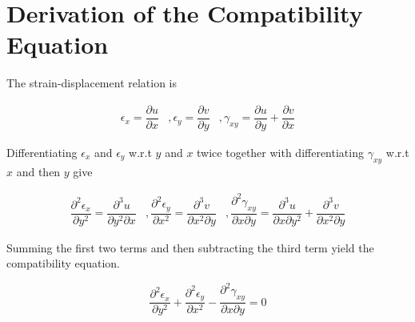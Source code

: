 \section{Derivation of the Compatibility Equation} \label{app:compatibility_eqn}

The strain-displacement relation is

\begin{equation*}
    \begin{matrix}
    \epsilon_x = \dfrac{\partial u}{\partial x} & , 
    \epsilon_y = \dfrac{\partial v}{\partial y} & , 
    \gamma_{xy} = \dfrac{\partial u}{\partial y} + \dfrac{\partial v}{\partial x}
    \end{matrix}
\end{equation*}

Differentiating $\epsilon_x$ and $\epsilon_y$ w.r.t $y$ and $x$ twice together with differentiating $\gamma_{xy}$ w.r.t $x$ and then $y$ give

\begin{equation*}
    \begin{matrix}
    \dfrac{\partial^2 \epsilon_x}{\partial y^2} = \dfrac{\partial^3 u}{\partial y^2 \partial x} & , 
    \dfrac{\partial^2 \epsilon_y}{\partial x^2} = \dfrac{\partial^3 v}{\partial x^2 \partial y} & ,
    \dfrac{\partial^2 \gamma_{xy}}{\partial x \partial y} = \dfrac{\partial^3 u}{\partial x \partial y^2} + \dfrac{\partial^3 v}{\partial x^2 \partial y}
    \end{matrix}
\end{equation*}

Summing the first two terms and then subtracting the third term yield the compatibility equation.

\begin{equation*}
    \dfrac{\partial^2 \epsilon_x}{\partial y^2} + \dfrac{\partial^2 \epsilon_y}{\partial x^2} - \dfrac{\partial^2 \gamma_{xy}}{\partial x \partial y} = 0
\end{equation*}